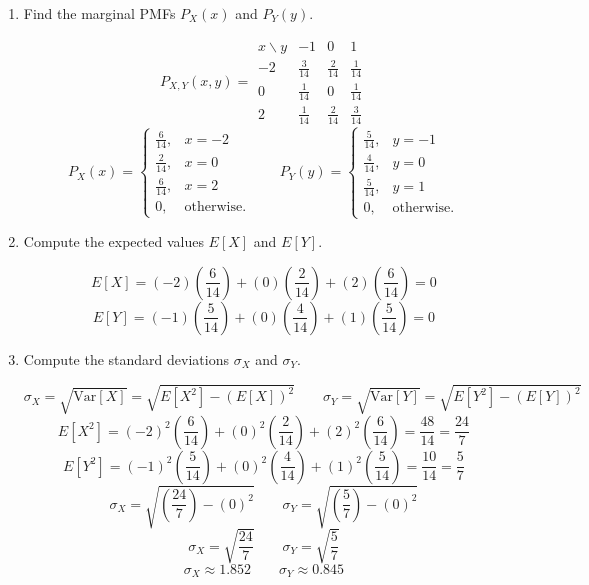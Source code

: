 \documentclass[12pt]{article}
\newenvironment{bluetext}
    {\par\begingroup\color{blue}\parindent=0pt\ignorespaces}
    {\par\endgroup\noindent\ignorespacesafterend}
\begin{document}
\begin{enumerate}
    \item[(a)] Find the marginal PMFs $P_X(x)$ and $P_Y(y)$.
    \begin{bluetext}
        \[
P_{X,Y}(x,y) =
\begin{array}{c|ccc}
x \backslash y & -1 & 0 & 1 \\ \hline
-2 & \tfrac{3}{14} & \tfrac{2}{14} & \tfrac{1}{14} \\[4pt]
0  & \tfrac{1}{14} & 0             & \tfrac{1}{14} \\[4pt]
2  & \tfrac{1}{14} & \tfrac{2}{14} & \tfrac{3}{14}
\end{array}
\]
        \[P_X(x)= 
        \begin{cases}
        \frac{6}{14}, & x=-2\\
        \frac{2}{14}, & x=0\\
        \frac{6}{14}, & x=2  \\
        0, & \text{otherwise.}
        \end{cases}
        \qquad
        P_Y(y)=
        \begin{cases}
        \frac{5}{14}, & y=-1\\
        \frac{4}{14}, & y=0\\
        \frac{5}{14}, & y=1  \\
        0, & \text{otherwise.}
        \end{cases}\]
    \end{bluetext}
    \item[(b)] Compute the expected values $E[X]$ and $E[Y]$.
    \begin{bluetext}
        \[
            E[X]=(-2)\left(\frac{6}{14}\right)+(0)\left(\frac{2}{14}\right)+(2)\left(\frac{6}{14}\right)=0
        \]
        \[
            E[Y]=(-1)\left(\frac{5}{14}\right)+(0)\left(\frac{4}{14}\right)+(1)\left(\frac{5}{14}\right)=0
        \]
    \end{bluetext}

    \item[(c)] Compute the standard deviations $\sigma_X$ and $\sigma_Y$.
    \begin{bluetext}
        \[\sigma_X=\sqrt{\text{Var}[X]}=\sqrt{E[X^2]-\left(E[X]\right)^2}\qquad\sigma_Y=\sqrt{\text{Var}[Y]}=\sqrt{E[Y^2]-\left(E[Y]\right)^2}\]
        \[
            E[X^2]=(-2)^2\left(\frac{6}{14}\right)+(0)^2\left(\frac{2}{14}\right)+(2)^2\left(\frac{6}{14}\right)
            =\frac{48}{14}=\frac{24}{7}
        \]
        \[
            E[Y^2]=(-1)^2\left(\frac{5}{14}\right)+(0)^2\left(\frac{4}{14}\right)+(1)^2\left(\frac{5}{14}\right)
            =\frac{10}{14}=\frac{5}{7}
        \]  
         \[\sigma_X=\sqrt{\left(\frac{24}{7}\right)-\left(0\right)^2}\qquad\sigma_Y=\sqrt{\left(\frac{5}{7}\right)-\left(0\right)^2}\]
         \[\sigma_X=\sqrt{\frac{24}{7}}\qquad\sigma_Y=\sqrt{\frac{5}{7}}\]
         \[\sigma_X\approx1.852\qquad\sigma_Y\approx0.845\]
    \end{bluetext}
\end{enumerate}
\end{document}
